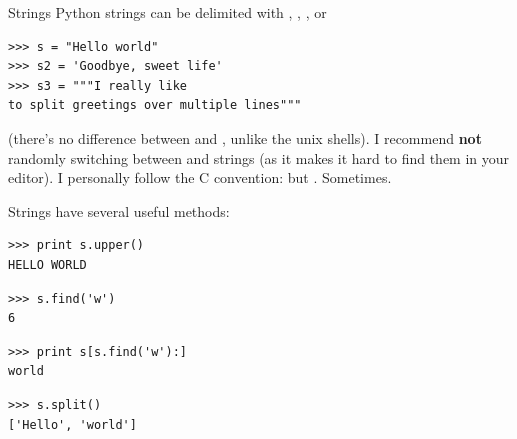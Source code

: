 \documentclass[10pt, t]{beamer}
\let\alert=\textbf
\begin{document}
\begin{frame}[fragile,label=sec-2-6]{Strings}
 Python strings can be delimited with , , , or  
\lstset{language=Python,label= ,caption= ,numbers=none}
\begin{lstlisting}
>>> s = "Hello world"
>>> s2 = 'Goodbye, sweet life'
>>> s3 = """I really like
to split greetings over multiple lines"""
\end{lstlisting}
(there's no difference between  and , unlike the unix shells).
\pause
I recommend \alert{not} randomly switching between   and  strings (as it makes it hard to
find them in your editor).  I personally follow the C convention:  but .
\pause 
Sometimes.

\pause
Strings have several useful methods:
\lstset{language=Python,label= ,caption= ,numbers=none}
\begin{lstlisting}
>>> print s.upper()
HELLO WORLD
\end{lstlisting}
\pause
\lstset{language=Python,label= ,caption= ,numbers=none}
\begin{lstlisting}
>>> s.find('w')
6
\end{lstlisting}
\pause
\lstset{language=Python,label= ,caption= ,numbers=none}
\begin{lstlisting}
>>> print s[s.find('w'):]
world
\end{lstlisting}
\pause
\lstset{language=Python,label= ,caption= ,numbers=none}
\begin{lstlisting}
>>> s.split()
['Hello', 'world']
\end{lstlisting}
\pause
\end{frame}
\end{document}
